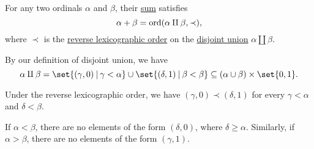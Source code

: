 \begin{proposition}\label{thm:ordinal_addition_disjoin_union}
  For any two ordinals \( \alpha \) and \( \beta \), their \hyperref[def:ordinal_arithmetic/addition]{sum} satisfies
  \begin{equation*}
    \alpha + \beta = \operatorname{ord}(\alpha \amalg \beta, \prec),
  \end{equation*}
  where \( \prec \) is the \hyperref[def:lexicographic_order]{reverse lexicographic order} on the \hyperref[def:disjoint_union]{disjoint union} \( \alpha \amalg \beta \).
\end{proposition}
\begin{comments}
  \item By our definition of disjoint union, we have
  \begin{equation*}
    \alpha \amalg \beta = \set{ (\gamma, 0) \given \gamma < \alpha } \cup \set{ (\delta, 1) \given \beta < \beta } \subseteq (\alpha \cup \beta) \times \set{ 0, 1 }.
  \end{equation*}

  Under the reverse lexicographic order, we have \( (\gamma, 0) \prec (\delta, 1) \) for every \( \gamma < \alpha \) and \( \delta < \beta \).

  If \( \alpha < \beta \), there are no elements of the form \( (\delta, 0) \), where \( \delta \geq \alpha \). Similarly, if \( \alpha > \beta \), there are no elements of the form \( (\gamma, 1) \).
\end{comments}
